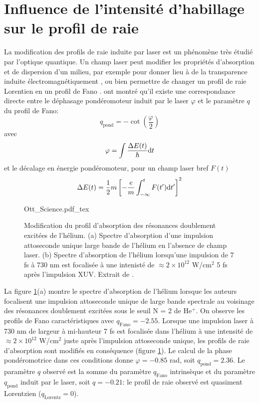 \section{Influence de l'intensité d'habillage sur le profil de raie}
La modification des profils de raie induite par laser est un phénomène très étudié par l'optique quantique. Un champ laser peut modifier les propriétés d'absorption et de dispersion d'un milieu, par exemple pour donner lieu à de la transparence induite électromagnétiquement , ou bien permettre de changer un profil de raie Lorentien en un profil de Fano .  ont montré qu'il existe une correspondance directe entre le déphasage pondéromoteur induit par le laser $\varphi$ et le paramètre $q$ du profil de Fano:
\begin{equation}
q_{\text{pond}} = - \cot (\frac{\varphi}{2})
\end{equation}
avec
\begin{equation}
\varphi = \int \frac{\Delta E (t)}{\hbar} \mathrm{d} t
\end{equation}
et le décalage en énergie pondéromoteur, pour un champ laser bref $F(t)$
\begin{equation}
\Delta E (t) = \frac{1}{2} m \left[ - \frac{e}{m} \int_{- \infty}^{t} F(t') \mathrm{d} t' \right]^2 
\end{equation}

\begin{figure} [ht]
\centering
\def\svgwidth{\textwidth}
{Ott_Science.pdf_tex}
\caption{Modification du profil d'absorption des résonances doublement excitées de l'hélium. (a) Spectre d'absorption d'une impulsion attoseconde unique large bande de l'hélium en l'absence de champ laser. (b) Spectre d'absorption de l'hélium lorsqu'une impulsion de 7 fs à 730 nm est focalisée à une intenisté de $\approx 2 \times 10^{12}$ W/cm$^2$ 5 fs après l'impulsion XUV. Extrait de .}
\label{fig:Ott_Science}
\end{figure}

La figure \ref{fig:Ott_Science}(a) montre le spectre d'absorption de l'hélium lorsque les auteurs focalisent une impulsion attoseconde unique de large bande spectrale au voisinage des résonances doublement excitées sous le seuil N = 2 de He$^+$. On observe les profils de Fano caractéristiques avec $q_{\text{Fano}} = -2.55$. Lorsque une impulsion laser à 730 nm de largeur à mi-hauteur 7 fs est focalisée dans l'hélium à une intensité de $\approx 2 \times 10^{12}$ W/cm$^2$ juste après l'impulsion attoseconde unique, les profils de raie d'absorption sont modifiés en conséquence (figure \ref{fig:Ott_Science}). Le calcul de la phase pondéromotrice dans ces conditions donne $\varphi = -0.85$ rad, soit $q_{\text{pond}} = 2.36$. Le paramètre $q$ observé est la somme du paramètre $q_{\text{Fano}}$ intrinsèque et du paramètre $q_{\text{pond}}$ induit par le laser, soit $q = -0.21$: le profil de raie observé est quasiment Lorentzien ($q_{\text{Lorentz}} = 0$).

